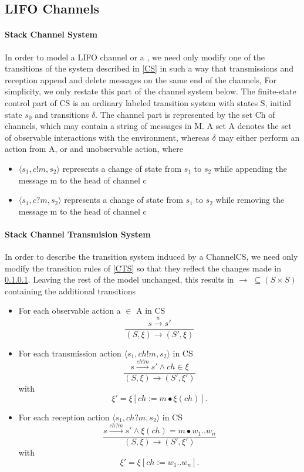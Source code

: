 \subsection{LIFO Channels}
\paragraph{Stack Channel System}
\label{StackCS}
In order to model a LIFO channel or a , we need only modify one of the transitions of the system described in \ref{CS} in such a way that transmissions and reception append and delete messages on the same end of the channels, For simplicity, we only restate this part of the channel system below. The finite-state control part of CS is an ordinary labeled transition system with states S, initial state $s_0$ and transitions $\delta$. The channel part is represented by the set Ch of channels, which may contain a string of messages in M. A set A denotes the set of observable interactions with the environment, whereas $\delta$ may either perform an action from A, or and unobservable action, where

\begin{itemize}
\item[]
$\langle s_1, c!m, s_2\rangle$ represents a change of state from $s_1$ to $s_2$ while appending the message m to the head of channel c
\item[]
$\langle s_1, c?m, s_2\rangle$ represents a change of state from $s_1$ to $s_2$ while removing the message m to the head of channel c
\end{itemize}

\paragraph{Stack Channel Transmision System}
In order to describe the transition system induced by a ChannelCS, we need only modify the transition rules of \ref{CTS} so that they reflect the changes made in \ref{StackCS}. Leaving the rest of the model unchanged, this results in $\rightarrow$ $\subseteq (S \times S)$ containing the additional transitions
\begin{itemize}
    \item
      For each observable action a $\in$ A in CS
      \[
      \dfrac{s \xrightarrow{a} s'}{(S, \xi) \rightarrow (S', \xi)}
      \]
    \item
      For each transmission action $\langle s_1, ch!m, s_2 \rangle$ in CS
      \[
      \dfrac{s \xrightarrow{ch!m} s' \wedge ch \in \xi}{(S, \xi) \rightarrow (S', \xi')} \] with \[ \xi' = \xi[ch := m \bullet \xi (ch)].
      \]
    \item
      For each reception action $\langle s_1, ch?m, s_2 \rangle$ in CS
      \[
      \dfrac{s \xrightarrow{ch?m} s' \wedge \xi(ch) = m \bullet w_1..w_n}{(S, \xi) \rightarrow (S', \xi')} \] with \[ \xi' = \xi[ch:= w_1..w_n].
      \]
  \end{itemize}

